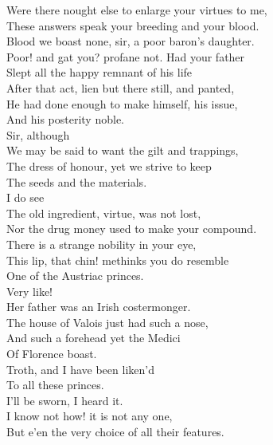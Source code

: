 \documentclass{memoir}
\begin{document}
\begin{drama*}
\mammonspeaks {} Were there nought else to enlarge your virtues to me,\\
 These answers speak your breeding and your blood.\\
\dolspeaks  Blood we boast none, sir, a poor baron's daughter.\\
\mammonspeaks  Poor! and gat you? profane not. Had your father\\
 Slept all the happy remnant of his life\\
 After that act, lien but there still, and panted,\\
 He had done enough to make himself, his issue,\\
 And his posterity noble.\\
\dolspeaks {} Sir, although\\
 We may be said to want the gilt and trappings,\\
 The dress of honour, yet we strive to keep\\
 The seeds and the materials.\\
\mammonspeaks {} I do see\\
 The old ingredient, virtue, was not lost,\\
 Nor the drug money used to make your compound.\\
 There is a strange nobility in your eye,\\
 This lip, that chin! methinks you do resemble\\
 One of the Austriac princes.\\
\facespeaks {} Very like!\\
 Her father was an Irish costermonger.\\
\mammonspeaks  The house of Valois just had such a nose,\\
 And such a forehead yet the Medici\\
 Of Florence boast.\\
\dolspeaks {} Troth, and I have been liken'd\\
 To all these princes.\\
\facespeaks {} I'll be sworn, I heard it.\\
\mammonspeaks {} I know not how! it is not any one,\\
 But e'en the very choice of all their features.\\

\end{drama*}
\end{document}

